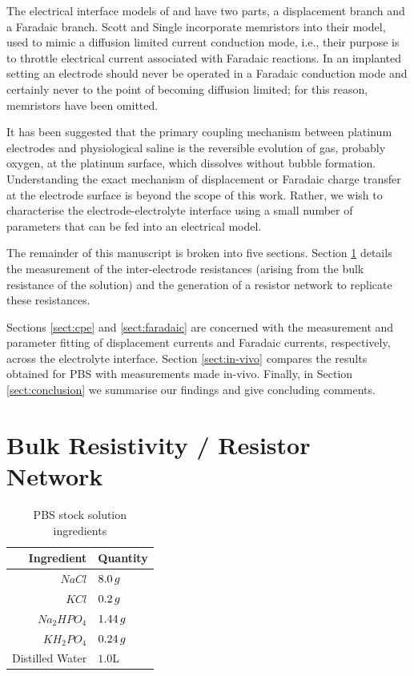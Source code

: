 \documentclass[journal, a4paper]{IEEEtran}
\begin{document}
The electrical interface models of \cite{Franks2005} and \cite{ScottSingle2013} have two parts, a displacement branch and a Faradaic branch.
    Scott and Single incorporate memristors into their model, used to mimic a diffusion limited current conduction mode, i.e., their purpose is to throttle electrical current associated with Faradaic reactions. In an implanted setting an electrode should never be operated in a Faradaic conduction mode and certainly never to the point of becoming diffusion limited; for this reason, memristors have been omitted.

It has been suggested that the primary coupling mechanism between platinum electrodes and physiological saline is the reversible evolution of gas, probably oxygen, at the platinum surface, which dissolves without bubble formation.\cite{Greatbatch1969} Understanding the exact mechanism of displacement or Faradaic charge transfer at the electrode surface is beyond the scope of this work. Rather, we wish to characterise the electrode-electrolyte interface using a small number of parameters that can be fed into an electrical model.

The remainder of this manuscript is broken into five sections. Section \ref{sect:resistorMesh} details the measurement of the inter-electrode resistances (arising from the bulk resistance of the solution) and the generation of a resistor network to replicate these resistances.

Sections \ref{sect:cpe} and \ref{sect:faradaic} are concerned with the measurement and parameter fitting of displacement currents and Faradaic currents, respectively, across the electrolyte interface. Section \ref{sect:in-vivo} compares the results obtained for PBS with measurements made in-vivo. Finally, in Section \ref{sect:conclusion} we summarise our findings and give concluding comments.


\section{Bulk Resistivity / Resistor Network }
\label{sect:resistorMesh}

\begin{table}
    \caption{PBS stock solution ingredients}
    \label{tab:PBSrecipe}
    \begin{center}
        \begin{tabular}{r | l}
            Ingredient & Quantity \\
            \hline
            $NaCl$ & $8.0\thinspace g$ \\
            $KCl$ & $0.2\thinspace g$ \\
            $Na_{2}HPO_{4}$ & $1.44\thinspace g$ \\
            $KH_{2}PO_{4}$ & $0.24\thinspace g$ \\
            Distilled Water & $1.0$\thinspace L \\
        \end{tabular}
    \end{center}
\end{table}
\end{document}
